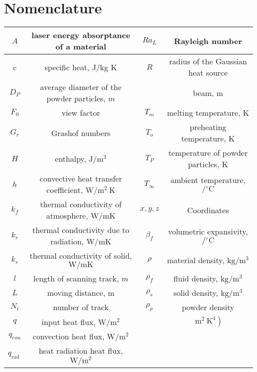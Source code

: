 \documentclass[10pt]{article}
\begin{document}
\section*{Nomenclature}
\begin{center}
\begin{tabular}{|c|c|c|c|}
\hline
$A$ & laser energy absorptance of a material & $R a_{L}$ & Rayleigh number \\
\hline
c & specific heat, J/kg K & $R$ & radius of the Gaussian heat source \\
\hline
$D_{P}$ & average diameter of the powder particles, $m$ &  & beam, $\mathrm{m}$ \\
\hline
$F_{0}$ & view factor & $T_{m}$ & melting temperature, $\mathrm{K}$ \\
\hline
$G_{r}$ & Grashof numbers & $T_{o}$ & preheating temperature, $\mathrm{K}$ \\
\hline
$H$ & enthalpy, $\mathrm{J} / \mathrm{m}^{3}$ & $T_{P}$ & temperature of powder particles, $\mathrm{K}$ \\
\hline
$h$ & convective heat transfer coefficient, $\mathrm{W} / \mathrm{m}^{2} \mathrm{~K}$ & $T_{\infty}$ & ambient temperature, $/{ }^{\circ} \mathrm{C}$ \\
\hline
$k_{f}$ & thermal conductivity of atmosphere, $\mathrm{W} / \mathrm{m} \mathrm{K}$ & $x, y, z$ & Coordinates \\
\hline
$k_{r}$ & thermal conductivity due to radiation, $\mathrm{W} / \mathrm{m} \mathrm{K}$ & $\beta_{f}$ & volumetric expansivity, $/{ }^{\circ} \mathrm{C}$ \\
\hline
$k_{s}$ & thermal conductivity of solid, $\mathrm{W} / \mathrm{m} \mathrm{K}$ & $\rho$ & material density, $\mathrm{kg} / \mathrm{m}^{3}$ \\
\hline
$l$ & length of scanning track, $m$ & $\rho_{f}$ & fluid density, $\mathrm{kg} / \mathrm{m}^{3}$ \\
\hline
$L$ & moving distance, $\mathrm{m}$ & $\rho_{s}$ & solid density, $\mathrm{kg} / \mathrm{m}^{3}$ \\
\hline
$N_{t}$ & number of track & $\rho_{p}$ & powder density \\
\hline
$q$ & input heat flux, $\mathrm{W} / \mathrm{m}^{2}$ &  & $\left.\mathrm{~m}^{2} \mathrm{~K}^{4}\right)$ \\
\hline
$q_{c o n}$ & convection heat flux, $\mathrm{W} / \mathrm{m}^{2}$ &  &  \\
\hline
$q_{\text {rad }}$ & heat radiation heat flux, $\mathrm{W} / \mathrm{m}^{2}$ &  &  \\
\hline
\end{tabular}
\end{center}
\end{document}
